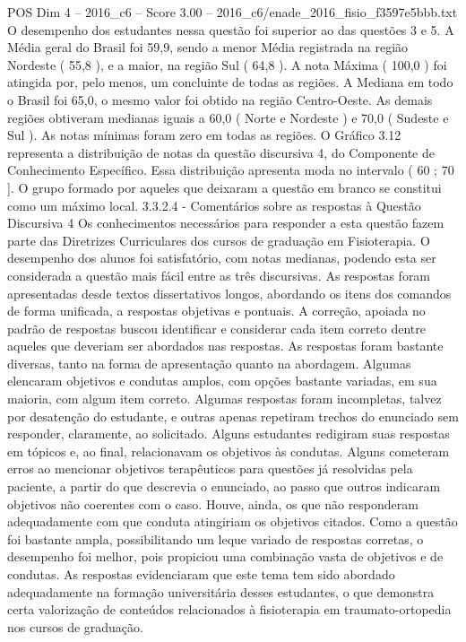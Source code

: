 \begin{textsample}{POS Dim 4 – 2016\_c6 – Score 3.00 – 2016\_c6/enade\_2016\_fisio\_f3597e5bbb.txt}
O desempenho dos estudantes nessa questão foi superior ao das questões 3 e 5.
A Média geral do Brasil foi 59,9, sendo a menor Média registrada na região Nordeste ( 55,8 ), e a maior, na região Sul ( 64,8 ).
A nota Máxima ( 100,0 ) foi atingida por, pelo menos, um concluinte de todas as regiões.
A Mediana em todo o Brasil foi 65,0, o mesmo valor foi obtido na região Centro-Oeste.
As demais regiões obtiveram medianas iguais a 60,0 ( Norte e Nordeste ) e 70,0 ( Sudeste e Sul ).
As notas mínimas foram zero em todas as regiões.
O Gráfico 3.12 representa a distribuição de notas da questão discursiva 4, do Componente de Conhecimento Específico.
Essa distribuição apresenta moda no intervalo ( 60 ; 70 ].
O grupo formado por aqueles que deixaram a questão em branco se constitui como um máximo local. 3.3.2.4 - Comentários sobre as respostas à Questão Discursiva 4 Os conhecimentos necessários para responder a esta questão fazem parte das Diretrizes Curriculares dos cursos de graduação em Fisioterapia.
O desempenho dos alunos foi satisfatório, com notas medianas, podendo esta ser considerada a questão mais fácil entre as três discursivas.
As respostas foram apresentadas desde textos dissertativos longos, abordando os itens dos comandos de forma unificada, a respostas objetivas e pontuais.
A correção, apoiada no padrão de respostas buscou identificar e considerar cada item correto dentre aqueles que deveriam ser abordados nas respostas.
As respostas foram bastante diversas, tanto na forma de apresentação quanto na abordagem.
Algumas elencaram objetivos e condutas amplos, com opções bastante variadas, em sua maioria, com algum item correto.
Algumas respostas foram incompletas, talvez por desatenção do estudante, e outras apenas repetiram trechos do enunciado sem responder, claramente, ao solicitado.
Alguns estudantes redigiram suas respostas em tópicos e, ao final, relacionavam os objetivos às condutas.
Alguns cometeram erros ao mencionar objetivos terapêuticos para questões já resolvidas pela paciente, a partir do que descrevia o enunciado, ao passo que outros indicaram objetivos não coerentes com o caso.
Houve, ainda, os que não responderam adequadamente com que conduta atingiriam os objetivos citados.
Como a questão foi bastante ampla, possibilitando um leque variado de respostas corretas, o desempenho foi melhor, pois propiciou uma combinação vasta de objetivos e de condutas.
As respostas evidenciaram que este tema tem sido abordado adequadamente na formação universitária desses estudantes, o que demonstra certa valorização de conteúdos relacionados à fisioterapia em traumato-ortopedia nos cursos de graduação.

\end{textsample}
